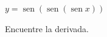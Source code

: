 \item $y = \operatorname{sen}(\operatorname{sen}(\operatorname{sen} x))$
\par
Encuentre la derivada.
